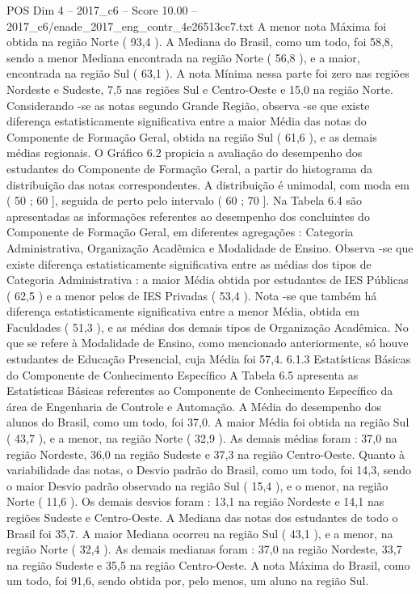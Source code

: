 \begin{textsample}{POS Dim 4 – 2017\_c6 – Score 10.00 – 2017\_c6/enade\_2017\_eng\_contr\_4e26513cc7.txt}
A menor nota Máxima foi obtida na região Norte ( 93,4 ).
A Mediana do Brasil, como um todo, foi 58,8, sendo a menor Mediana encontrada na região Norte ( 56,8 ), e a maior, encontrada na região Sul ( 63,1 ).
A nota Mínima nessa parte foi zero nas regiões Nordeste e Sudeste, 7,5 nas regiões Sul e Centro-Oeste e 15,0 na região Norte.
Considerando -se as notas segundo Grande Região, observa -se que existe diferença estatisticamente significativa entre a maior Média das notas do Componente de Formação Geral, obtida na região Sul ( 61,6 ), e as demais médias regionais.
O Gráfico 6.2 propicia a avaliação do desempenho dos estudantes do Componente de Formação Geral, a partir do histograma da distribuição das notas correspondentes.
A distribuição é unimodal, com moda em ( 50 ; 60 ], seguida de perto pelo intervalo ( 60 ; 70 ].
Na Tabela 6.4 são apresentadas as informações referentes ao desempenho dos concluintes do Componente de Formação Geral, em diferentes agregações : Categoria Administrativa, Organização Acadêmica e Modalidade de Ensino.
Observa -se que existe diferença estatisticamente significativa entre as médias dos tipos de Categoria Administrativa : a maior Média obtida por estudantes de IES Públicas ( 62,5 ) e a menor pelos de IES Privadas ( 53,4 ).
Nota -se que também há diferença estatisticamente significativa entre a menor Média, obtida em Faculdades ( 51,3 ), e as médias dos demais tipos de Organização Acadêmica.
No que se refere à Modalidade de Ensino, como mencionado anteriormente, só houve estudantes de Educação Presencial, cuja Média foi 57,4. 6.1.3 Estatísticas Básicas do Componente de Conhecimento Específico A Tabela 6.5 apresenta as Estatísticas Básicas referentes ao Componente de Conhecimento Específico da área de Engenharia de Controle e Automação.
A Média do desempenho dos alunos do Brasil, como um todo, foi 37,0.
A maior Média foi obtida na região Sul ( 43,7 ), e a menor, na região Norte ( 32,9 ).
As demais médias foram : 37,0 na região Nordeste, 36,0 na região Sudeste e 37,3 na região Centro-Oeste.
Quanto à variabilidade das notas, o Desvio padrão do Brasil, como um todo, foi 14,3, sendo o maior Desvio padrão observado na região Sul ( 15,4 ), e o menor, na região Norte ( 11,6 ).
Os demais desvios foram : 13,1 na região Nordeste e 14,1 nas regiões Sudeste e Centro-Oeste.
A Mediana das notas dos estudantes de todo o Brasil foi 35,7.
A maior Mediana ocorreu na região Sul ( 43,1 ), e a menor, na região Norte ( 32,4 ).
As demais medianas foram : 37,0 na região Nordeste, 33,7 na região Sudeste e 35,5 na região Centro-Oeste.
A nota Máxima do Brasil, como um todo, foi 91,6, sendo obtida por, pelo menos, um aluno na região Sul.

\end{textsample}
